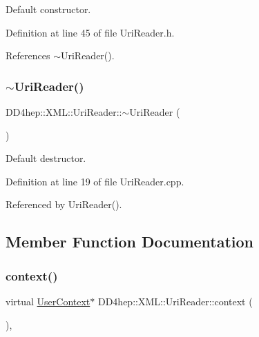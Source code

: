 Default constructor. 



Definition at line 45 of file Uri\+Reader.\+h.



References $\sim$\+Uri\+Reader().

\hypertarget{class_d_d4hep_1_1_x_m_l_1_1_uri_reader_af8a3cc8ac2e0a5c0f2ea45c3894a2582}{}\label{class_d_d4hep_1_1_x_m_l_1_1_uri_reader_af8a3cc8ac2e0a5c0f2ea45c3894a2582} 
\subsubsection{\texorpdfstring{$\sim$\+Uri\+Reader()}{~UriReader()}}
{\footnotesize\ttfamily D\+D4hep\+::\+X\+M\+L\+::\+Uri\+Reader\+::$\sim$\+Uri\+Reader (\begin{DoxyParamCaption}{ }\end{DoxyParamCaption})\hspace{0.3cm}{\ttfamily [virtual]}}



Default destructor. 



Definition at line 19 of file Uri\+Reader.\+cpp.



Referenced by Uri\+Reader().



\subsection{Member Function Documentation}
\hypertarget{class_d_d4hep_1_1_x_m_l_1_1_uri_reader_a9f8d06469b3e5bf1e69c72c4285dfcac}{}\label{class_d_d4hep_1_1_x_m_l_1_1_uri_reader_a9f8d06469b3e5bf1e69c72c4285dfcac} 
\subsubsection{\texorpdfstring{context()}{context()}}
{\footnotesize\ttfamily virtual \hyperlink{struct_d_d4hep_1_1_x_m_l_1_1_uri_reader_1_1_user_context}{User\+Context}$\ast$ D\+D4hep\+::\+X\+M\+L\+::\+Uri\+Reader\+::context (\begin{DoxyParamCaption}{ }\end{DoxyParamCaption})\hspace{0.3cm}{\ttfamily [inline]}, {\ttfamily [virtual]}}



